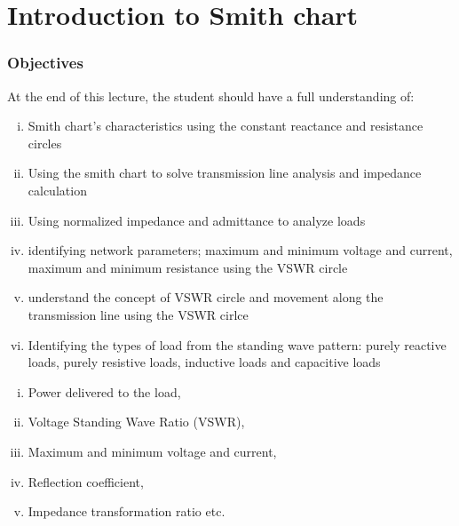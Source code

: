 \chapter{Introduction to Smith chart}\label{lec:lec7}

\begin{mdframed}[ backgroundcolor=lightblue, linewidth=1pt, hidealllines=true]
    \subsection{\textbf{Objectives}}
    At the end of this lecture, the student should have a full understanding of:
    \begin{enumerate}[(i)]
    \item Smith chart's characteristics using the constant reactance and resistance circles
    \item Using the smith chart to solve transmission line analysis and impedance calculation
    \item Using normalized impedance and admittance to analyze loads
    \item identifying network parameters; maximum and minimum voltage and current, maximum  and minimum resistance using the VSWR circle
    \item understand the concept of VSWR circle and movement along the transmission line  using the VSWR cirlce
    \item Identifying the types of load from the standing wave pattern: purely reactive loads, purely resistive loads, inductive loads and capacitive loads
    \end{enumerate}
\end{mdframed}

\vspace{0.7cm}{Previously, we were able to derive equations for different parameters for a transmission line such as;}
\begin{enumerate}[(i)]
\item Power delivered to the load,
\item Voltage Standing Wave Ratio (VSWR),
\item Maximum and minimum voltage and current,
\item Reflection coefficient,
\item Impedance transformation ratio etc.
\end{enumerate}

